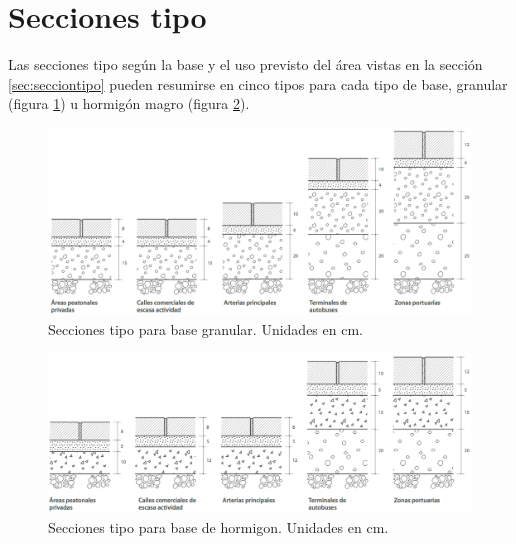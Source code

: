 \section{Secciones tipo}

Las secciones tipo según la base y el uso previsto del área vistas en la sección \ref{sec:secciontipo} pueden resumirse en cinco tipos para cada tipo de base, granular (figura \ref{fig:seccionestipogranular}) u hormigón magro (figura \ref{fig:seccionestipohormigon}).

\begin{figure}[!htb]
\centering
\includegraphics[width=15cm]{seccionestipo_1.png}
\caption{Secciones tipo para base granular. Unidades en cm.}
\label{fig:seccionestipogranular}
\end{figure}

\begin{figure}[!htb]
\centering
\includegraphics[width=15cm]{seccionestipo_2.png}
\caption{Secciones tipo para base de hormigon. Unidades en cm.}
\label{fig:seccionestipohormigon}
\end{figure}
